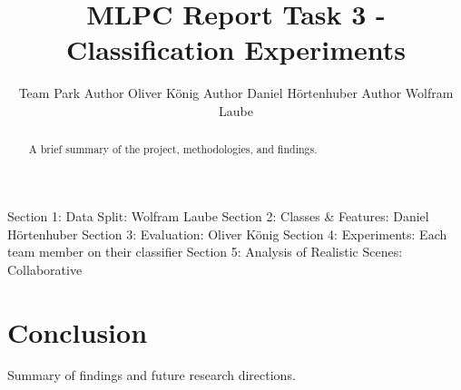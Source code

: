 \documentclass{article}
\title{MLPC Report Task 3 - Classification Experiments}
\author{%
  Team Park \And
  Author Oliver König \And
  Author Daniel Hörtenhuber \And
  Author Wolfram Laube
}
\begin{document}
\maketitle

\begin{abstract}
A brief summary of the project, methodologies, and findings.
\end{abstract}

\begin{contributions}
  Section 1: Data Split: Wolfram Laube \AND
  Section 2: Classes & Features: Daniel Hörtenhuber \AND
  Section 3: Evaluation: Oliver König \AND
  Section 4: Experiments: Each team member on their classifier \AND
  Section 5: Analysis of Realistic Scenes: Collaborative
\end{contributions}







\section{Conclusion}
Summary of findings and future research directions.
\end{document}
